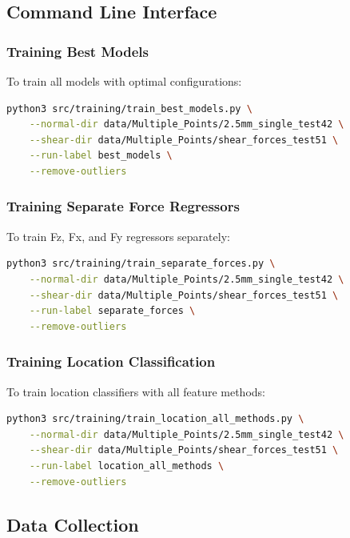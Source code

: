 \documentclass[11pt,a4paper]{article}
\begin{document}
\subsection{Command Line Interface}

\subsubsection{Training Best Models}

To train all models with optimal configurations:

\begin{lstlisting}[language=bash]
python3 src/training/train_best_models.py \
    --normal-dir data/Multiple_Points/2.5mm_single_test42 \
    --shear-dir data/Multiple_Points/shear_forces_test51 \
    --run-label best_models \
    --remove-outliers
\end{lstlisting}

\subsubsection{Training Separate Force Regressors}

To train Fz, Fx, and Fy regressors separately:

\begin{lstlisting}[language=bash]
python3 src/training/train_separate_forces.py \
    --normal-dir data/Multiple_Points/2.5mm_single_test42 \
    --shear-dir data/Multiple_Points/shear_forces_test51 \
    --run-label separate_forces \
    --remove-outliers
\end{lstlisting}

\subsubsection{Training Location Classification}

To train location classifiers with all feature methods:

\begin{lstlisting}[language=bash]
python3 src/training/train_location_all_methods.py \
    --normal-dir data/Multiple_Points/2.5mm_single_test42 \
    --shear-dir data/Multiple_Points/shear_forces_test51 \
    --run-label location_all_methods \
    --remove-outliers
\end{lstlisting}

\subsection{Data Collection}
\end{document}
